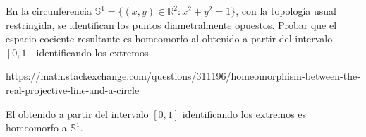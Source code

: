 \begin{ejr}[38]
  En la circunferencia $\mathbb{S}^{1} = \{ (x, y) \in \mathbb{R}^{2} : x^{2} + y^{2} = 1 \}$, con la topología usual restringida, se identifican los puntos diametralmente opuestos. Probar que el espacio cociente resultante es homeomorfo al obtenido a partir del intervalo $[0, 1]$ identificando los extremos.
\end{ejr}

\begin{sol}
%
https://math.stackexchange.com/questions/311196/homeomorphism-between-the-real-projective-line-and-a-circle


  El obtenido a partir del intervalo $[0, 1]$ identificando los extremos es homeomorfo a $\mathbb{S}^{1}$.
\end{sol}
